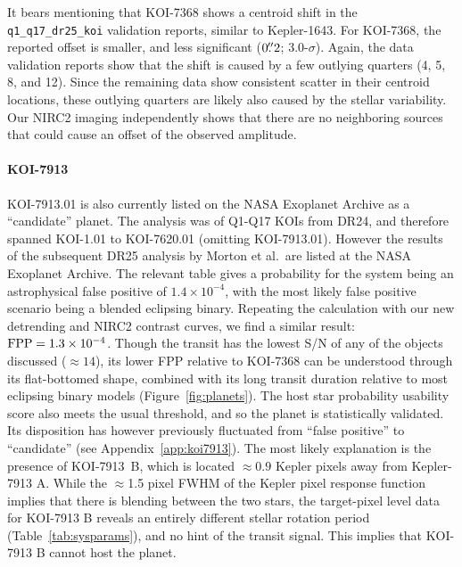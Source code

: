 \documentclass[12pt,twocolumn]{aastex63}
\begin{document}
It bears mentioning that KOI-7368 shows a centroid shift in the
\texttt{q1\_q17\_dr25\_koi} validation reports, similar to
Kepler-1643.  For KOI-7368, the reported offset is smaller, and less
significant ($0\mbox{$.\!\!^{\prime\prime}$}2$; 3.0-$\sigma$).  Again, the data
validation reports show that the shift is caused by a few outlying
quarters (4, 5, 8, and 12).  Since the remaining data show
consistent scatter in their centroid locations, these
outlying quarters are likely also caused by the stellar variability.  
Our NIRC2 imaging independently shows that there are no neighboring
sources that could cause an offset of the observed amplitude.

\paragraph{KOI-7913}
KOI-7913.01 is also currently listed on the NASA Exoplanet Archive as a
``candidate'' planet.  The \citet{morton_false_2016}
analysis was of Q1-Q17 KOIs from DR24, and therefore spanned KOI-1.01
to KOI-7620.01 (omitting KOI-7913.01).  However the results of the
subsequent DR25 analysis by Morton et al.\ are listed at the NASA
Exoplanet Archive.  The relevant table gives a probability for the
system being an astrophysical false positive of $1.4\times10^{-4}$,
with the most likely false positive scenario being a blended eclipsing
binary.  Repeating the calculation with our new detrending and
NIRC2 contrast curves, we find a similar result: ${\rm FPP} =
1.3\times10^{-4}$.  Though the transit has the lowest S/N of any of
the objects discussed ($\approx$$14$), its lower FPP relative to
KOI-7368 can be understood through its flat-bottomed shape,
combined with its long transit duration relative to most
eclipsing binary models (Figure~\ref{fig:planets}).  The host star
probability usability score \citep{2017ksci.rept...16B} also meets the
usual threshold, and so the planet is statistically validated.  Its
disposition has however previously fluctuated from ``false positive''
to ``candidate'' (see Appendix~\ref{app:koi7913}).  The most likely
explanation is the presence of KOI-7913~B, which is located
$\approx0.9$ Kepler pixels away from Kepler-7913 A.  
While the $\approx$1.5 pixel FWHM of the Kepler pixel response function
implies that there is blending between the two stars,
the target-pixel level data for KOI-7913 B reveals an
entirely different stellar rotation
period (Table~\ref{tab:sysparams}), and no hint of the transit signal.
This implies that KOI-7913 B cannot host the planet.
\end{document}
